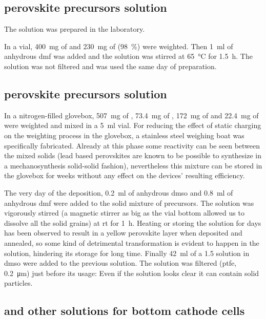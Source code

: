 	\subsection{ perovskite precursors solution}\label{precursors_mapicl}
	
		The solution was prepared in the laboratory.
		
		In a vial, \SI{400}{\mg} of  and \SI{230}{\mg} of \PbCltwo (98~\%) were weighted. Then \SI{1}{\ml} of anhydrous \gls{dmf} was added and the solution was stirred at \SI{65}{\celsius} for \SI{1.5}{\hour}. The solution was not filtered and was used the same day of preparation.

	\subsection{ perovskite precursors solution}\label{precursors_csfamapbibr}
		
		In a nitrogen-filled glovebox, \SI{507}{\mg} of \PbItwo, \SI{73.4}{\mg} of \PbBrtwo, \SI{172}{\mg} of  and \SI{22.4}{\mg} of  were weighted and mixed in a \SI{5}{\ml} vial. For reducing the effect of static charging on the weighting process in the glovebox, a stainless steel weighing boat was specifically fabricated. Already at this phase some reactivity can be seen between the mixed solids (lead based perovskites are known to be possible to synthesize in a mechanosynthesis solid-solid fashion), nevertheless this mixture can be stored in the glovebox for weeks without any effect on the devices' resulting efficiency.
		
		The very day of the deposition, \SI{0.2}{\ml} of anhydrous \gls{dmso} and \SI{0.8}{\ml} of anhydrous \gls{dmf} were added to the solid mixture of precursors. The solution was vigorously stirred (a magnetic stirrer as big as the vial bottom allowed us to dissolve all the solid grains) at \gls{rt} for \SI{1}{\hour}. Heating or storing the solution for days has been observed to result in a yellow perovskite layer when deposited and annealed, so some kind of detrimental transformation is evident to happen in the solution, hindering its storage for long time. Finally \SI{42}{\ml} of
		a \SI{1.5}{\Molar} \CsI solution in \gls{dmso} were added to the previous solution. The solution was filtered (\gls{ptfe}, \SI{0.2}{\um}) just before its usage: Even if the solution looks clear it can contain solid particles.

	\subsection{\Spiro and other  solutions for bottom cathode cells}
	
